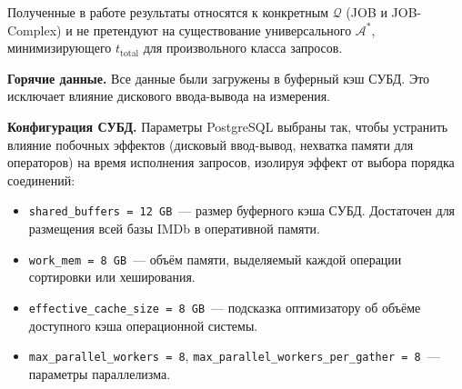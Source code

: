 Полученные в работе результаты относятся к конкретным $\mathcal{Q}$ (JOB и JOB-Complex)
и не претендуют на существование универсального $\mathcal{A}^*$,
минимизирующего $t_{\mathrm{total}}$ для произвольного класса запросов.
\par

\textbf{Горячие данные.}
Все данные были загружены в буферный кэш СУБД. Это исключает влияние дискового ввода-вывода на измерения.


\textbf{Конфигурация СУБД.}
Параметры PostgreSQL выбраны так, чтобы устранить влияние побочных эффектов
(дисковый ввод-вывод, нехватка памяти для операторов) на время исполнения запросов,
изолируя эффект от выбора порядка соединений:
\begin{itemize}
    \item \texttt{shared\_buffers = 12\,GB}~--- размер буферного кэша СУБД.
    Достаточен для размещения всей базы IMDb в оперативной памяти.

    \item \texttt{work\_mem = 8\,GB}~--- объём памяти, выделяемый каждой
    операции сортировки или хеширования.

    \item \texttt{effective\_cache\_size = 8\,GB}~--- подсказка оптимизатору
    об объёме доступного кэша операционной системы.

    \item \texttt{max\_parallel\_workers = 8},
    \texttt{max\_parallel\_workers\_per\_gather = 8}~---
    параметры параллелизма.
\end{itemize}


